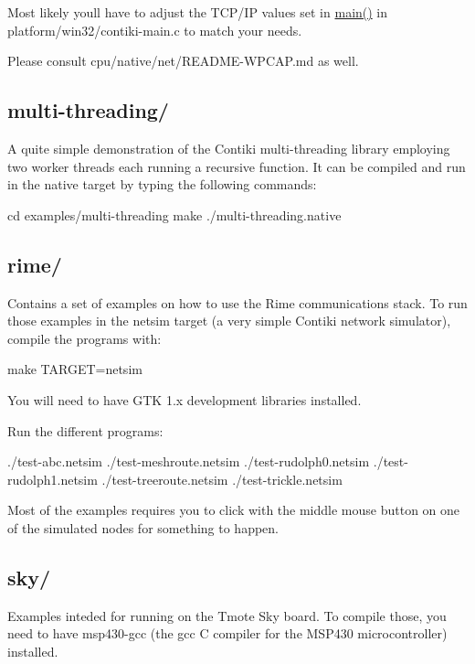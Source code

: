 Most likely you\textquotesingle{}ll have to adjust the T\+C\+P/\+I\+P values set in \hyperlink{group__IPV6_ga0c99d968a34e803d378692bde2e3f18f}{main()} in platform/win32/contiki-\/main.\+c to match your needs.

Please consult cpu/native/net/\+R\+E\+A\+D\+M\+E-\/\+W\+P\+C\+A\+P.\+md as well.

\subsection*{multi-\/threading/ }

A quite simple demonstration of the Contiki multi-\/threading library employing two worker threads each running a recursive function. It can be compiled and run in the \textquotesingle{}native\textquotesingle{} target by typing the following commands\+: \begin{DoxyVerb}cd examples/multi-threading
make
./multi-threading.native
\end{DoxyVerb}


\subsection*{rime/ }

Contains a set of examples on how to use the Rime communications stack. To run those examples in the \textquotesingle{}netsim\textquotesingle{} target (a very simple Contiki network simulator), compile the programs with\+: \begin{DoxyVerb}make TARGET=netsim
\end{DoxyVerb}


You will need to have G\+T\+K 1.\+x development libraries installed.

Run the different programs\+: \begin{DoxyVerb}./test-abc.netsim
./test-meshroute.netsim
./test-rudolph0.netsim
./test-rudolph1.netsim
./test-treeroute.netsim
./test-trickle.netsim
\end{DoxyVerb}


Most of the examples requires you to click with the middle mouse button on one of the simulated nodes for something to happen.

\subsection*{sky/ }

Examples inteded for running on the Tmote Sky board. To compile those, you need to have msp430-\/gcc (the gcc C compiler for the M\+S\+P430 microcontroller) installed.

